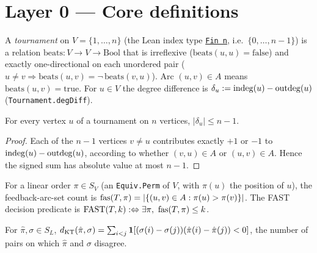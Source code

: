\section{Layer 0 --- Core definitions}

\begin{definition}
\label{def:tournament}
\leanok
A \emph{tournament} on $V = \{1,\dots,n\}$ (the Lean index type
\href{https://leanprover-community.github.io/mathlib4_docs/Init/Prelude.html#Fin}{\texttt{Fin n}},
i.e.\ $\{0,\dots,n-1\}$) is a relation
$\mathrm{beats} : V \to V \to \mathrm{Bool}$ that is irreflexive
($\mathrm{beats}(u,u) = \mathrm{false}$) and exactly one-directional on each
unordered pair ($u \ne v \Rightarrow \mathrm{beats}(u,v) =
\neg\,\mathrm{beats}(v,u)$). Arc $(u,v) \in A$ means
$\mathrm{beats}(u,v) = \mathrm{true}$. For $u \in V$ the degree difference is
$\delta_u := \operatorname{indeg}(u) - \operatorname{outdeg}(u)$
(\texttt{Tournament.degDiff}).
\end{definition}

\begin{lemma}
\label{lem:degdiff_bound}
\leanok
{}
For every vertex $u$ of a tournament on $n$ vertices, $|\delta_u| \le n - 1$.
\end{lemma}
\begin{proof}
\leanok
Each of the $n-1$ vertices $v \ne u$ contributes exactly $+1$ or $-1$ to
$\operatorname{indeg}(u) - \operatorname{outdeg}(u)$, according to whether $(v,u) \in A$ or $(u,v) \in A$.
Hence the signed sum has absolute value at most $n-1$.
\end{proof}

\begin{definition}
\label{def:fast}
\leanok
{}
For a linear order $\pi \in S_V$ (an \texttt{Equiv.Perm} of $V$, with $\pi(u)$ the
position of $u$), the feedback-arc-set count is
$\operatorname{fas}(T,\pi) = |\{(u,v) \in A : \pi(u) > \pi(v)\}|$. The FAST decision predicate
is $\mathrm{FAST}(T,k) :\Leftrightarrow \exists \pi,\ \operatorname{fas}(T,\pi) \le k$.
\end{definition}

\begin{definition}
\label{def:kendall_tau}
\leanok
For $\hat\pi, \sigma \in S_L$,
$d_{\mathrm{KT}}(\hat\pi,\sigma) = \sum_{i<j}
\mathbf{1}[(\sigma(i)-\sigma(j))(\hat\pi(i)-\hat\pi(j)) < 0]$, the number of pairs on
which $\hat\pi$ and $\sigma$ disagree.
\end{definition}

